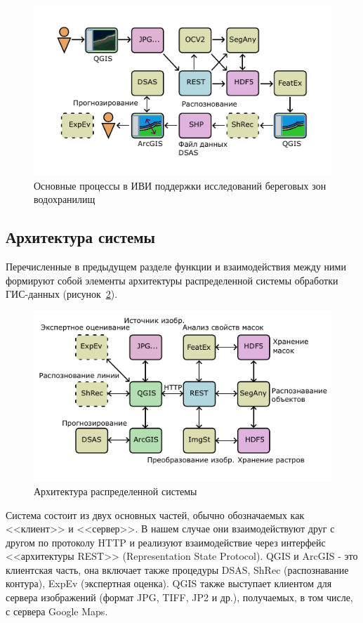 \documentclass[732,14pt,final]{studrep}
\begin{document}
  \begin{figure}[htp]
    \centering
    \includegraphics[width=\linewidth]{pics/tech.pdf}
    \caption{Основные процессы в ИВИ поддержки исследований береговых зон водохранилищ}\label{fig:processes}
  \end{figure}

\subsection{Архитектура системы}
Перечисленные в предыдущем разделе функции и взаимодействия между ними формируют собой элементы архитектуры распределенной системы обработки ГИС-данных (рисунок~\ref{fig:arch}).

\begin{figure}[htp]
\includegraphics[width=\linewidth]{pics/arch-p.pdf}
  \caption{Архитектура распределенной системы} \label{fig:arch}
\end{figure}

Система состоит из двух основных частей, обычно обозначаемых как <<клиент>> и <<сервер>>. В нашем случае они взаимодействуют друг с другом по протоколу HTTP и реализуют взаимодействие через интерфейс <<архитектуры REST>> (Representation State Protocol). QGIS и ArcGIS - это клиентская часть, она включает также процедуры DSAS, ShRec (распознавание контура), ExpEv (экспертная оценка). QGIS также выступает клиентом для сервера изображений (формат JPG, TIFF, JP2 и др.), получаемых, в том числе, с сервера Google Maps.
\end{document}
